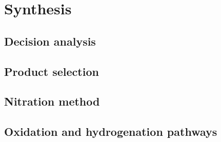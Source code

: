 \section{Synthesis}
\label{sec:synthesis}
\subsection{Decision analysis}

\subsection{Product selection}

\subsection{Nitration method}


\subsection{Oxidation and hydrogenation pathways}

